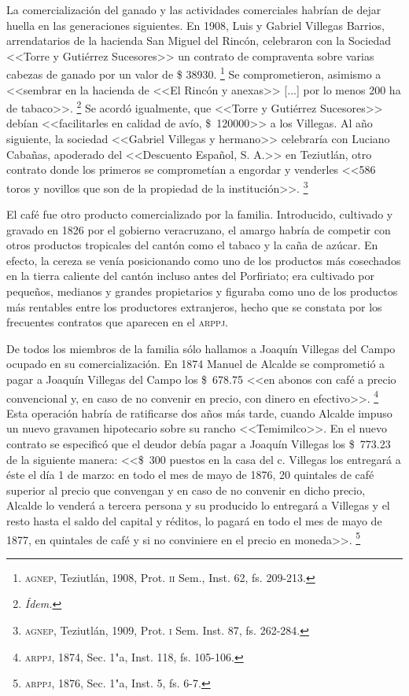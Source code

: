 \documentclass[14pt,twoside,final]{extbook} %
\let\oldfootnote\footnote
\renewcommand\footnote[1]{%
\oldfootnote{\hspace{1mm}#1}}
\begin{document}
La comercialización del ganado y las actividades comerciales habrían de dejar huella en las generaciones siguientes. En 1908, Luis y Gabriel Villegas Barrios, arrendatarios de la hacienda San Miguel del Rincón, celebraron con la Sociedad <<Torre y Gutiérrez Sucesores>> un contrato de compraventa sobre varias cabezas de ganado por un valor de \$ 38930.\footnote{\textsc{agnep}, Teziutlán, 1908, Prot. \textsc{ii} Sem., Inst. 62, fs. 209-213.} Se comprometieron, asimismo a <<sembrar en la hacienda de <<El Rincón y anexas>> [...] por lo menos 200 ha de tabaco>>.\footnote{\em Ídem.} Se acordó igualmente, que <<Torre y Gutiérrez Sucesores>> debían <<facilitarles en calidad de avío, \$~120000>> a los Villegas. Al año siguiente, la sociedad <<Gabriel Villegas y
hermano>> celebraría con Luciano Cabañas, apoderado del <<Descuento Español, S. A.>> en Teziutlán, otro contrato donde los primeros se comprometían a engordar y venderles <<586 toros y novillos que son de la propiedad de la institución>>.\footnote{\textsc{agnep}, Teziutlán, 1909, Prot. \textsc{i} Sem. Inst. 87, fs. 262-284.}

El café fue otro producto comercializado por la familia. Introducido, cultivado y gravado en 1826 por el gobierno veracruzano, el amargo habría de competir con otros productos tropicales del cantón como el tabaco y la caña de azúcar. En efecto, la cereza se venía posicionando como uno de los productos más cosechados en la tierra caliente del cantón incluso antes del Porfiriato; era cultivado por pequeños, medianos y grandes propietarios y figuraba como uno de los productos más rentables entre los productores extranjeros, hecho que se constata por los frecuentes contratos que aparecen en el
\textsc{arppj}.

De todos los miembros de la familia sólo hallamos a Joaquín Villegas del Campo ocupado en su comercialización. En 1874 Manuel de Alcalde se comprometió a pagar a Joaquín Villegas del Campo los \$~678.75 <<en abonos con café a precio convencional y, en caso de no convenir en precio, con dinero en efectivo>>.\footnote{\textsc{arppj}, 1874, Sec. 1"a, Inst. 118, fs. 105-106.} Esta operación habría de ratificarse dos años más tarde, cuando Alcalde impuso un nuevo gravamen hipotecario sobre su rancho <<Temimilco>>. En el nuevo contrato se especificó que el deudor debía pagar a Joaquín Villegas los \$~773.23 de la siguiente manera: <<\$~300 puestos en la casa del c. Villegas los entregará a éste el día 1 de marzo: en todo el mes de mayo de 1876, 20 quintales de café superior al precio que convengan y en caso de no convenir en dicho precio, Alcalde lo venderá a tercera persona y su producido lo entregará a Villegas y el resto hasta el saldo del capital y réditos, lo pagará en todo el mes de mayo de 1877, en quintales de café y si no conviniere en el precio en moneda>>.\footnote{\textsc{arppj}, 1876, Sec. 1"a, Inst. 5, fs. 6-7.}
\end{document}
